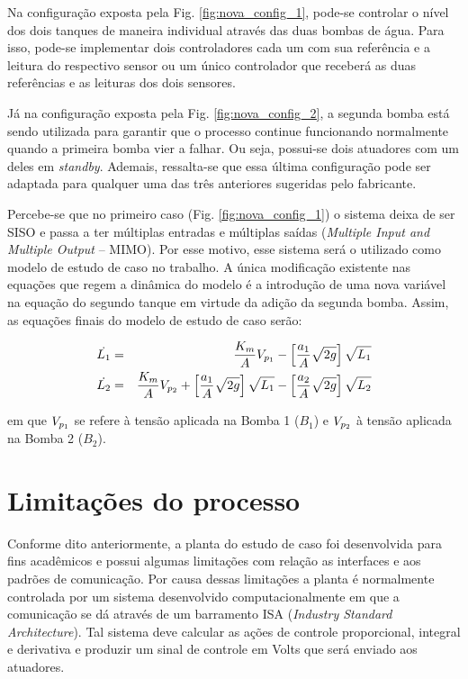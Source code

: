 Na configuração exposta pela Fig. \ref{fig:nova_config_1}, pode-se controlar o
nível dos dois tanques de maneira individual através das duas bombas de água.
Para isso, pode-se implementar dois controladores cada um com sua referência e a
leitura do respectivo sensor ou um único controlador que receberá as duas
referências e as leituras dos dois sensores.

Já na configuração exposta pela Fig. \ref{fig:nova_config_2}, a segunda bomba
está sendo utilizada para garantir que o processo continue funcionando
normalmente quando a primeira bomba vier a falhar. Ou seja, possui-se dois
atuadores com um deles em {\it standby}.  Ademais, ressalta-se que essa última
configuração pode ser adaptada para qualquer uma das três anteriores sugeridas
pelo fabricante.

Percebe-se que no primeiro caso (Fig. \ref{fig:nova_config_1}) o sistema deixa
de ser SISO e passa a ter múltiplas entradas e múltiplas saídas ({\it Multiple
Input and Multiple Output} -- MIMO). Por esse motivo, esse sistema será o
utilizado como modelo de estudo de caso no trabalho. A única modificação
existente nas equações que regem a dinâmica do modelo é a introdução de uma nova
variável na equação do segundo tanque em virtude da adição da segunda bomba.
Assim, as equações finais do modelo de estudo de caso serão:

\begin{eqnarray}
\dot{L_1} & = & \frac{K_m}{A}V_{p_{\tiny 1}} -
                \left[\frac{a_1}{A}\sqrt{2g}\right]\sqrt{L_1}
                \label{eq:l1_ponto}\\
\dot{L_2} & = & \frac{K_m}{A}V_{p_{\tiny 2}} +
                \left[\frac{a_1}{A}\sqrt{2g}\right]\sqrt{L_1} -
                \left[\frac{a_2}{A}\sqrt{2g}\right]\sqrt{L_2}
                \label{eq:l2_ponto}
\end{eqnarray}

\noindent em que $V_{p_{\tiny 1}}$ se refere à tensão aplicada na Bomba 1
($B_1$) e $V_{p_{\tiny 2}}$ à tensão aplicada na Bomba 2 ($B_2$).


\section{Limitações do processo}\label{sec:limitacoes}
Conforme dito anteriormente, a planta do estudo de caso foi desenvolvida para
fins acadêmicos e possui algumas limitações com relação as interfaces e aos
padrões de comunicação. Por causa dessas limitações a planta é normalmente
controlada por um sistema desenvolvido computacionalmente em que a comunicação
se dá através de um barramento ISA ({\it Industry Standard Architecture}). Tal
sistema deve calcular as ações de controle proporcional, integral e derivativa e
produzir um sinal de controle em Volts que será enviado aos atuadores.

